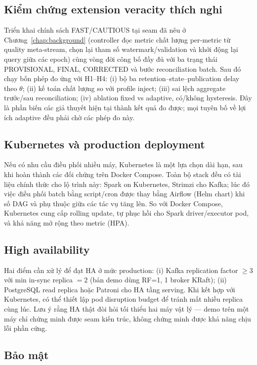 \subsection{Kiểm chứng extension veracity thích nghi}

Triển khai chính sách FAST/CAUTIOUS tại seam đã nêu ở
Chương~\ref{chap:background} (controller đọc metric chất lượng per-metric
từ quality meta-stream, chọn lại tham số watermark/validation và khởi động
lại query giữa các epoch) cùng vòng đời công bố đầy đủ với ba trạng thái
PROVISIONAL, FINAL, CORRECTED và bước reconciliation batch. Sau đó chạy bốn
phép
đo ứng với H1--H4: (i) bộ ba retention--state--publication delay theo
$\theta$; (ii) kế toán chất lượng so với profile inject; (iii) sai lệch
aggregate trước/sau reconciliation; (iv) ablation fixed vs adaptive, có/không
hysteresis. Đây là phần biến các giả thuyết hiện tại thành kết quả đo được;
mọi tuyên bố về lợi ích adaptive đều phải chờ các phép đo này.

\subsection{Kubernetes và production deployment}

Nếu có nhu cầu điều phối nhiều máy, Kubernetes là một lựa chọn dài hạn,
sau khi hoàn thành các đối chứng trên Docker Compose. Toàn bộ stack đều có tài liệu chính thức cho lộ trình này:
Spark on Kubernetes, Strimzi cho Kafka; lúc đó việc điều phối batch bằng
script/cron được thay bằng Airflow (Helm chart) khi số DAG và phụ thuộc
giữa các tác vụ tăng lên. So với Docker
Compose, Kubernetes cung cấp rolling update, tự phục hồi cho Spark
driver/executor pod, và khả năng mở rộng theo metric (HPA).

\subsection{High availability}

Hai điểm cần xử lý để đạt HA ở mức production: (i) Kafka replication factor
$\geq 3$ với min in-sync replica $= 2$ (bản demo dùng RF=1, 1 broker KRaft);
(ii) PostgreSQL read replica hoặc Patroni cho HA tầng serving. Khi kết hợp với
Kubernetes, có thể thiết lập pod disruption budget để tránh mất nhiều replica
cùng lúc. Lưu ý rằng HA thật đòi hỏi tối thiểu hai máy vật lý --- demo trên
một máy chỉ chứng minh được seam kiến trúc, không chứng minh được khả năng
chịu lỗi phần cứng.

\subsection{Bảo mật}

